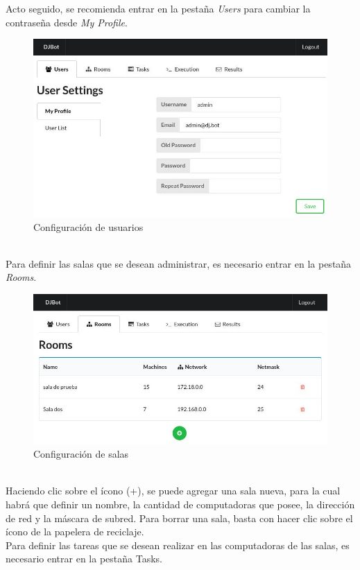 \documentclass[a4paper,12pt]{article}
\begin{document}
Acto seguido, se recomienda entrar en la pestaña \emph{Users} para cambiar la contraseña desde \emph{My Profile}.\\

\begin{figure}[htb]
\centering
\includegraphics[width=.8\linewidth]{./img/users.photo.jpg}
\caption{Configuración de usuarios}
\end{figure} \\

\newpage
Para definir las salas que se desean administrar, es necesario entrar en la pestaña \textit{Rooms}.\\

\begin{figure}[htb]
\centering
\includegraphics[width=.9\linewidth]{./img/rooms.photo.jpg}
\caption{Configuración de salas}
\end{figure}\\

Haciendo clic sobre el ícono (+), se puede agregar una sala nueva, para la cual habrá que definir un nombre, la cantidad de computadoras que posee, la dirección de red y la máscara de subred. Para borrar una sala, basta con hacer clic sobre el ícono de la papelera de reciclaje.\\

Para definir las tareas que se desean realizar en las computadoras de las salas, es necesario entrar en la pestaña Tasks.\\
\end{document}
